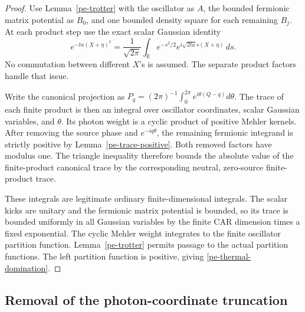 \begin{proof}
Use Lemma~\ref{pe-trotter} with the oscillator as \(A\), the bounded
fermionic matrix potential as \(B_0\), and one bounded density square
for each remaining \(B_j\). At each product step use the exact scalar
Gaussian identity
\[
e^{-t a(X+\eta)^2}
=\frac1{\sqrt{2\pi}}\int_{\mathbb R}e^{-s^2/2}
          e^{i\sqrt{2ta}s(X+\eta)}\,ds.
\]
No commutation between different \(X\)'s is assumed. The separate
product factors handle that issue.

Write the canonical projection as
\(P_q=(2\pi)^{-1}\int_0^{2\pi}e^{i\theta(Q-q)}d\theta\).
The trace of each finite product is then an integral over oscillator
coordinates, scalar Gaussian variables, and \(\theta\). Its photon
weight is a cyclic product of positive Mehler kernels. After removing
the source phase and \(e^{-iq\theta}\), the remaining fermionic
integrand is strictly positive by Lemma~\ref{pe-trace-positive}.
Both removed factors have modulus one. The triangle inequality
therefore bounds the absolute value of the finite-product canonical
trace by the corresponding neutral, zero-source finite-product trace.

These integrals are legitimate ordinary finite-dimensional integrals.
The scalar kicks are unitary and the fermionic matrix potential is
bounded, so its trace is bounded uniformly in all Gaussian variables
by the finite CAR dimension times a fixed exponential. The cyclic
Mehler weight integrates to the finite oscillator partition function.
Lemma~\ref{pe-trotter} permits passage to the actual partition functions.
The left partition function is positive, giving
\eqref{pe-thermal-domination}.
\end{proof}

\subsection{Removal of the photon-coordinate truncation}

